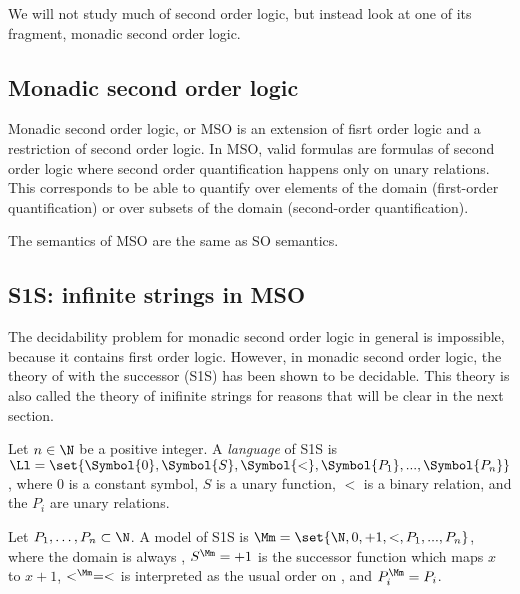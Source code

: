 We will not study much of second order logic, but instead
look at one of its fragment, monadic second order logic.

\subsection{Monadic second order logic}

Monadic second order logic, or MSO is an extension of
fisrt order logic and a restriction of second order logic.
In MSO, valid formulas are formulas of second order logic
where second order quantification happens only on unary relations.
This corresponds to be able to quantify over elements
of the domain (first-order quantification)
or over subsets of the domain (second-order quantification).

The semantics of MSO are the same as SO semantics.



\subsection{S1S: infinite strings in MSO}

The decidability problem for monadic second order logic
in general is impossible, because it contains first order logic.
However, in monadic second order logic, the theory of \N with
the successor (S1S) has been shown to be decidable.
This theory is also called the theory of inifinite strings
for reasons that will be clear in the next section.

\begin{definition}
    Let $n \in \N$ be a positive integer.
    A \emph{language}  of S1S is $\Ll = \set{\Symbol{0}, \Symbol{S}, \Symbol{<}, \Symbol{P_1}, ..., \Symbol{P_n}}$,
    where $0$ is a constant symbol, $S$ is a unary function,
    $<$ is a binary relation, and the $P_i$ are unary relations.

    Let $P_1, \dots, P_n \subset \N$. A model of S1S is
    $\Mm = \set{\N, 0, +1, <, P_1, ..., P_n}$,
    where the domain is always \N, $S^\Mm = +1$ is the successor function
    which maps $x$ to $x+1$, $<^\Mm = <$ is interpreted as the usual order
    on \N, and $P_i^\Mm = P_i$.

\end{definition}

